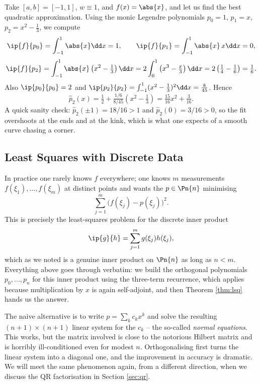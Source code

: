 \begin{example}
  Take $[a,b] = [-1,1]$, $w \equiv 1$, and $f(x) = \abs{x}$, and let us find the best quadratic approximation. Using the monic Legendre polynomials $p_0 = 1$, $p_1 = x$, $p_2 = x^2 - \tfrac13$, we compute
  $$
  \ip{f}{p_0} = \int_{-1}^1 \abs{x} \dd x = 1, \qquad \ip{f}{p_1} = \int_{-1}^1 \abs{x}\, x \dd x = 0,
  $$
  $$
  \ip{f}{p_2} = \int_{-1}^1 \abs{x}\left(x^2 - \tfrac13\right)\dd x = 2\int_0^1\left(x^3 - \tfrac{x}{3}\right)\dd x = 2\left(\tfrac14 - \tfrac16\right) = \tfrac16 .
  $$
  Also $\ip{p_0}{p_0} = 2$ and $\ip{p_2}{p_2} = \int_{-1}^1 (x^2 - \tfrac13)^2\dd x = \tfrac{8}{45}$. Hence
  $$
  \hat p_2(x) = \tfrac12 + \tfrac{1/6}{8/45}\left(x^2 - \tfrac13\right) = \tfrac{15}{16}x^2 + \tfrac{3}{16}.
  $$
  A quick sanity check: $\hat p_2(\pm 1) = 18/16 > 1$ and $\hat p_2(0) = 3/16 > 0$, so the fit overshoots at the ends and at the kink, which is what one expects of a smooth curve chasing a corner.
\end{example}

\subsection{Least Squares with Discrete Data}

In practice one rarely knows $f$ everywhere; one knows $m$ measurements $f(\xi_1), \dots, f(\xi_m)$ at distinct points and wants the $p \in \Pn{n}$ minimising
$$
\sum_{j=1}^m \big(f(\xi_j) - p(\xi_j)\big)^2 .
$$
This is precisely the least-squares problem for the discrete inner product
$$
\ip{g}{h} = \sum_{j=1}^m g(\xi_j)h(\xi_j),
$$
which as we noted is a genuine inner product on $\Pn{n}$ as long as $n < m$. Everything above goes through verbatim: we build the orthogonal polynomials $p_0, \dots, p_n$ for this inner product using the three-term recurrence, which applies because multiplication by $x$ is again self-adjoint, and then Theorem \ref{thm:lsq} hands us the answer.

\begin{remark}
  The naive alternative is to write $p = \sum_k c_k x^k$ and solve the resulting $(n+1) \times (n+1)$ linear system for the $c_k$ -- the so-called \emph{normal equations}. This works, but the matrix involved is close to the notorious Hilbert matrix and is horribly ill-conditioned even for modest $n$. Orthogonalising first turns the linear system into a diagonal one, and the improvement in accuracy is dramatic. We will meet the same phenomenon again, from a different direction, when we discuss the QR factorisation in Section \ref{sec:qr}.
\end{remark}


